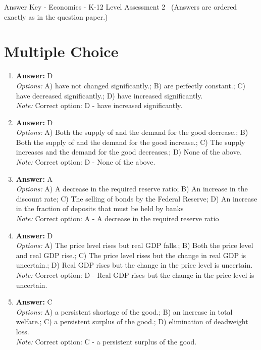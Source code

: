 \documentclass[12pt]{article}
\begin{document}
\begin{center}
Answer Key - Economics - K-12 Level Assessment 2 \
\small (Answers are ordered exactly as in the question paper.)
\end{center}

\section*{Multiple Choice}
\begin{enumerate}[label=\arabic*.]
\item \textbf{Answer:} D
\\ \textit{Options:} A) have not changed significantly.; B) are perfectly constant.; C) have decreased significantly.; D) have increased significantly.
\\ \textit{Note:} Correct option: D - have increased significantly.
\item \textbf{Answer:} D
\\ \textit{Options:} A) Both the supply of and the demand for the good decrease.; B) Both the supply of and the demand for the good increase.; C) The supply increases and the demand for the good decreases.; D) None of the above.
\\ \textit{Note:} Correct option: D - None of the above.
\item \textbf{Answer:} A
\\ \textit{Options:} A) A decrease in the required reserve ratio; B) An increase in the discount rate; C) The selling of bonds by the Federal Reserve; D) An increase in the fraction of deposits that must be held by banks
\\ \textit{Note:} Correct option: A - A decrease in the required reserve ratio
\item \textbf{Answer:} D
\\ \textit{Options:} A) The price level rises but real GDP falls.; B) Both the price level and real GDP rise.; C) The price level rises but the change in real GDP is uncertain.; D) Real GDP rises but the change in the price level is uncertain.
\\ \textit{Note:} Correct option: D - Real GDP rises but the change in the price level is uncertain.
\item \textbf{Answer:} C
\\ \textit{Options:} A) a persistent shortage of the good.; B) an increase in total welfare.; C) a persistent surplus of the good.; D) elimination of deadweight loss.
\\ \textit{Note:} Correct option: C - a persistent surplus of the good.
\end{enumerate}
\end{document}
